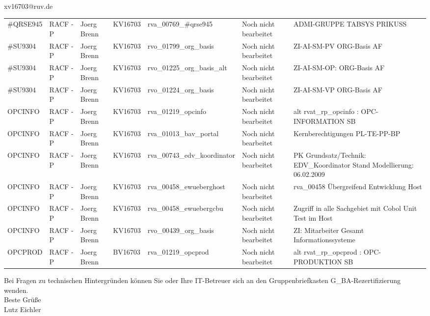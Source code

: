 \documentclass[a4paper,landscape,12pt]{letter}
\begin{document}
\begin{letter}{xv16703@ruv.de\hfill \break}
\begin{tiny}
\begin{longtable}{|p{35mm}|p{15mm}|p{25mm}|p{10mm}|p{40mm}|p{50mm}|p{50mm}|}
\#QRSE945 & RACF - P & Joerg Brenn & KV16703 & rva\_00769\_\#qrse945 & Noch nicht bearbeitet & ADMI-GRUPPE TABSYS PRIKUSS \\
\#SU9304 & RACF - P & Joerg Brenn & KV16703 & rvo\_01799\_org\_basis & Noch nicht bearbeitet & ZI-AI-SM-PV ORG-Basis AF \\
\#SU9304 & RACF - P & Joerg Brenn & KV16703 & rvo\_01225\_org\_basis\_alt & Noch nicht bearbeitet & ZI-AI-SM-OP: ORG-Basis AF \\
\#SU9304 & RACF - P & Joerg Brenn & KV16703 & rvo\_01224\_org\_basis & Noch nicht bearbeitet & ZI-AI-SM-VP ORG-Basis AF \\
OPCINFO & RACF - P & Joerg Brenn & KV16703 & rva\_01219\_opcinfo & Noch nicht bearbeitet & alt rvat\_rp\_opcinfo          : OPC- INFORMATION                         SB \\
OPCINFO & RACF - P & Joerg Brenn & KV16703 & rva\_01013\_bav\_portal & Noch nicht bearbeitet & Kernberechtigungen PL-TE-PP-BP \\
OPCINFO & RACF - P & Joerg Brenn & KV16703 & rva\_00743\_edv\_koordinator & Noch nicht bearbeitet & PK Grundsatz/Technik: EDV\_Koordinator Stand Modellierung: 06.02.2009 \\
OPCINFO & RACF - P & Joerg Brenn & KV16703 & rva\_00458\_ewueberghost & Noch nicht bearbeitet & rva\_00458 Übergreifend Entwicklung Host \\
OPCINFO & RACF - P & Joerg Brenn & KV16703 & rva\_00458\_ewuebergcbu & Noch nicht bearbeitet & Zugriff in alle Sachgebiet mit Cobol Unit Test im Host \\
OPCINFO & RACF - P & Joerg Brenn & KV16703 & rvo\_00439\_org\_basis & Noch nicht bearbeitet & ZI: Mitarbeiter Gesamt Informationssysteme \\
OPCPROD & RACF - P & Joerg Brenn & BV16703 & rva\_01219\_opcprod & Noch nicht bearbeitet & alt rvat\_rp\_opcprod          : OPC-PRODUKTION                           SB \\

\hline
		\end{longtable}
		\end{tiny}
	
\begin{minipage}{\textwidth}
			Bei Fragen zu technischen Hintergründen können Sie 
			oder Ihre IT-Betreuer sich an den Gruppenbriefkasten 
			G\_BA-Rezertifizierung
			wenden.\\
			\linebreak
			Beste Grüße\\
			Lutz Eichler
	\end{minipage}
	\end{letter}
	
\end{document}
